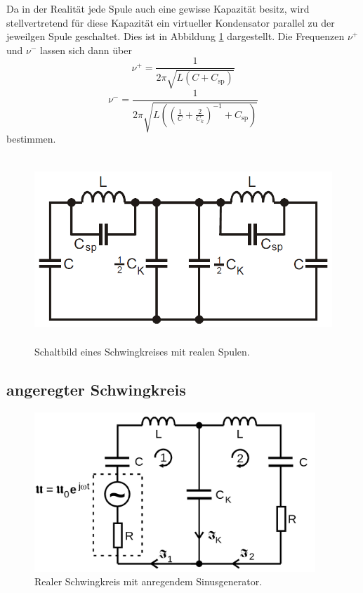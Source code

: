 Da in der Realität jede Spule auch eine gewisse Kapazität besitz, wird stellvertretend für diese Kapazität ein
virtueller Kondensator parallel zu der jeweilgen Spule geschaltet. Dies ist in Abbildung \ref{fig:bild7} dargestellt. 
Die Frequenzen $\nu^+$ und $\nu^-$ lassen sich dann über
\begin{equation}
    \nu^+=\frac{1}{2\pi\sqrt{L(C+C_{\text {sp}})}}
\end{equation}
\begin{equation}
    \nu^-=\frac{1}{2\pi\sqrt{L\left(\left(\frac{1}{C}+\frac{2}{C_k}\right)^{-1}+C_{\text {sp}}\right)}}
\end{equation}
bestimmen.

\begin{figure}

    \centering
    \includegraphics[height=7.0cm]{data/Bild7.png}
    \caption{Schaltbild eines Schwingkreises mit realen Spulen.}
    \label{fig:bild7}
\end{figure}

\subsection{angeregter Schwingkreis}

\begin{figure}

    \centering
    \includegraphics[height=6.0cm]{data/Bild4.png}
    \caption{Realer Schwingkreis mit anregendem Sinusgenerator.}
    \label{fig:bild4}
\end{figure}

